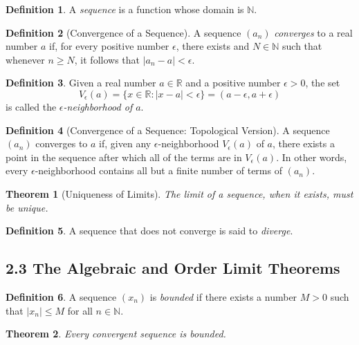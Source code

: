 \documentclass[11pt]{amsart}
\newtheorem*{theorem}{Theorem}
\theoremstyle{definition}
\newtheorem*{definition}{Definition}
\newcommand{\N}{\mathbb{N}}
\newcommand{\R}{\mathbb{R}}
\newcommand{\abs}[1]{|#1|}
\newcommand{\st}{\mathrel{:}}
\begin{document}
\begin{definition}
  A \emph{sequence} is a function whose domain is $\N$.
\end{definition}

\begin{definition}[Convergence of a Sequence]
  A sequence $(a_n)$ \emph{converges} to a real number $a$ if, for every
  positive number $\epsilon$, there exists and $N \in \N$ such that whenever $n
  \ge N$, it follows that $\abs{a_n - a} < \epsilon$.
\end{definition}

\begin{definition}
  Given a real number $a \in \R$ and a positive number $\epsilon > 0$, the set
  \[
    V_\epsilon(a) = \{x \in \R \st \abs{x - a} < \epsilon\} = (a - \epsilon, a +
    \epsilon)
  \]
  is called the \emph{$\epsilon$-neighborhood of $a$}.
\end{definition}

\begin{definition}[Convergence of a Sequence: Topological Version]
  A sequence $(a_n)$ converges to $a$ if, given any $\epsilon$-neighborhood
  $V_\epsilon(a)$ of $a$, there exists a point in the sequence after which all
  of the terms are in $V_\epsilon(a)$. In other words, every
  $\epsilon$-neighborhood contains all but a finite number of terms of $(a_n)$.
\end{definition}

\begin{theorem}[Uniqueness of Limits]
  The limit of a sequence, when it exists, must be unique.
\end{theorem}

\begin{definition}
  A sequence that does not converge is said to \emph{diverge}.
\end{definition}

\subsection*{2.3 The Algebraic and Order Limit Theorems}

\begin{definition}
  A sequence $(x_n)$ is \emph{bounded} if there exists a number $M > 0$ such
  that $\abs{x_n} \le M$ for all $n \in \N$.
\end{definition}

\begin{theorem}
  Every convergent sequence is bounded.
\end{theorem}
\end{document}
